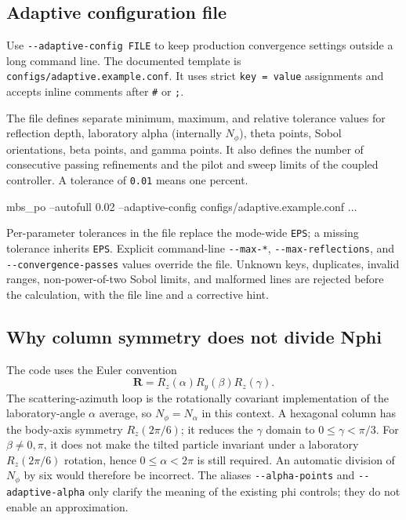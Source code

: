 \documentclass[
  10pt,
  a4paper,
]{article}
\newenvironment{Shaded}{}{}
\newcommand{\NormalTok}[1]{#1}
\begin{document}
\subsection{Adaptive configuration file}

Use \texttt{-\/-adaptive-config FILE} to keep production convergence
settings outside a long command line. The documented template is
\texttt{configs/adaptive.example.conf}. It uses strict
\texttt{key = value} assignments and accepts inline comments after
\texttt{\#} or \texttt{;}.

The file defines separate minimum, maximum, and relative tolerance values for
reflection depth, laboratory alpha (internally \(N_\phi\)), theta points,
Sobol orientations, beta points, and gamma points. It also defines the number
of consecutive passing refinements and the pilot and sweep limits of the
coupled controller. A tolerance of \texttt{0.01} means one percent.

\begin{Shaded}
\begin{Highlighting}[]
\NormalTok{mbs_po --autofull 0.02 --adaptive-config configs/adaptive.example.conf ...}
\end{Highlighting}
\end{Shaded}

Per-parameter tolerances in the file replace the mode-wide \texttt{EPS}; a
missing tolerance inherits \texttt{EPS}. Explicit command-line
\texttt{-\/-max-*}, \texttt{-\/-max-reflections}, and
\texttt{-\/-convergence-passes} values override the file. Unknown keys,
duplicates, invalid ranges, non-power-of-two Sobol limits, and malformed lines
are rejected before the calculation, with the file line and a corrective hint.

\subsection{Why column symmetry does not divide Nphi}

The code uses the Euler convention
\[
 \mathbf{R}=R_z(\alpha)R_y(\beta)R_z(\gamma).
\]
The scattering-azimuth loop is the rotationally covariant implementation of
the laboratory-angle \(\alpha\) average, so \(N_\phi=N_\alpha\) in this
context. A hexagonal column has the body-axis symmetry
\(R_z(2\pi/6)\); it reduces the \(\gamma\) domain to
\(0\leq\gamma<\pi/3\). For \(\beta\ne0,\pi\), it does not make the tilted
particle invariant under a laboratory \(R_z(2\pi/6)\) rotation, hence
\(0\leq\alpha<2\pi\) is still required. An automatic division of
\(N_\phi\) by six would therefore be incorrect. The aliases
\texttt{-\/-alpha-points} and \texttt{-\/-adaptive-alpha} only clarify the
meaning of the existing phi controls; they do not enable an approximation.
\end{document}
